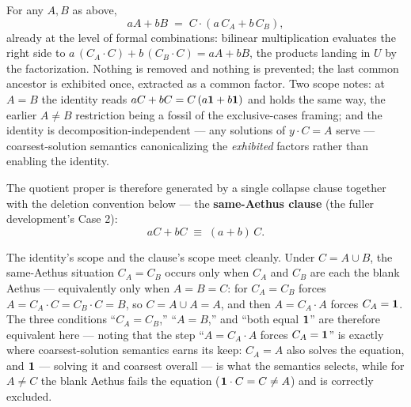 \begin{prop}\label{prop:factor}
For any $A, B$ as above,
\begin{equation}
aA + bB \;=\; C \cdot (a\, C_A + b\, C_B), \label{eq:main}
\end{equation}
already at the level of formal combinations: bilinear multiplication evaluates the right side to $a\,(C_A \cdot C) + b\,(C_B \cdot C) = aA + bB$, the products landing in $U$ by the factorization. Nothing is removed and nothing is prevented; the last common ancestor is exhibited once, extracted as a common factor. Two scope notes: at $A = B$ the identity reads $aC + bC = C\,(a\mathbf{1} + b\mathbf{1})$ and holds the same way, the earlier $A \neq B$ restriction being a fossil of the exclusive-cases framing; and the identity is decomposition-independent --- any solutions of $y \cdot C = A$ serve --- coarsest-solution semantics canonicalizing the \emph{exhibited} factors rather than enabling the identity.
\end{prop}

\noindent The quotient proper is therefore generated by a single collapse clause together with the deletion convention below --- the \textbf{same-Aethus clause} (the fuller development's Case 2):
\begin{equation}
aC + bC \;\equiv\; (a+b)\, C. \label{eq:degenerate}
\end{equation}

The identity's scope and the clause's scope meet cleanly. Under $C = A \cup B$, the same-Aethus situation $C_A = C_B$ occurs only when $C_A$ and $C_B$ are each the blank Aethus --- equivalently only when $A = B = C$: for $C_A = C_B$ forces $A = C_A \cdot C = C_B \cdot C = B$, so $C = A \cup A = A$, and then $A = C_A \cdot A$ forces $C_A = \mathbf{1}$. The three conditions ``$C_A = C_B$,'' ``$A = B$,'' and ``both equal $\mathbf{1}$'' are therefore equivalent here --- noting that the step ``$A = C_A \cdot A$ forces $C_A = \mathbf{1}$'' is exactly where coarsest-solution semantics earns its keep: $C_A = A$ also solves the equation, and $\mathbf{1}$ --- solving it and coarsest overall --- is what the semantics selects, while for $A \neq C$ the blank Aethus fails the equation ($\mathbf{1} \cdot C = C \neq A$) and is correctly excluded.


